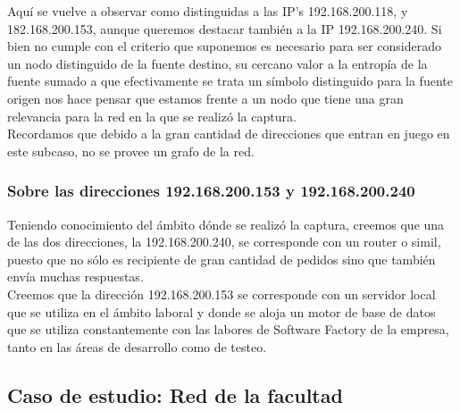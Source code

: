 \indent Aquí se vuelve a observar como distinguidas a las IP's 192.168.200.118, y 182.168.200.153, aunque queremos destacar también a la IP 192.168.200.240. Si bien no cumple con el criterio que suponemos es necesario para ser considerado un nodo distinguido de la fuente destino, su cercano valor a la entropía de la fuente sumado a que efectivamente se trata un símbolo distinguido para la fuente origen nos hace pensar que estamos frente a un nodo que tiene una gran relevancia para la red en la que se realizó la captura.\\

\indent Recordamos que debido a la gran cantidad de direcciones que entran en juego en este subcaso, no se provee un grafo de la red.\\

\subsubsection{Sobre las direcciones 192.168.200.153 y 192.168.200.240}

\indent \indent Teniendo conocimiento del ámbito dónde se realizó la captura, creemos que una de las dos direcciones, la 192.168.200.240, se corresponde con un router o simil, puesto que no sólo es recipiente de gran cantidad de pedidos sino que también envía muchas respuestas.\\
\indent Creemos que la dirección 192.168.200.153 se corresponde con un servidor local que se utiliza en el ámbito laboral y donde se aloja un motor de base de datos que se utiliza constantemente con las labores de Software Factory de la empresa, tanto en las áreas de desarrollo como de testeo.\\

\newpage

\subsection{Caso de estudio: Red de la facultad}

